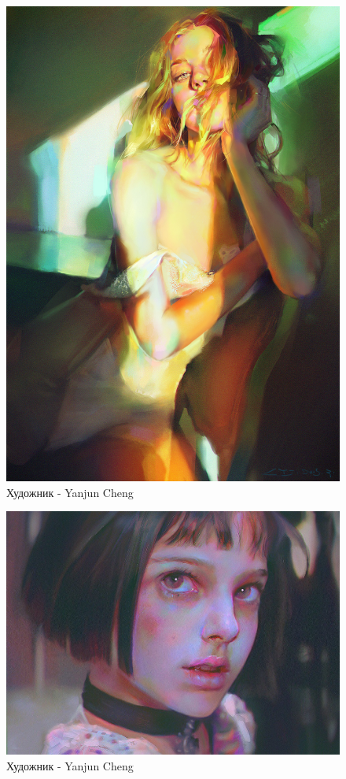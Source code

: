 \documentclass[12pt, a4paper]{article}
\theoremstyle{plain}              %
\begin{document}
\begin{figure}[H]
\begin{center}
\includegraphics[scale=0.2]{y1.jpg}
\end{center}
\caption{Художник - Yanjun Cheng}
\end{figure}

\begin{figure}[H]
\begin{center}
\includegraphics{y2.jpg}
\end{center}
\caption{Художник - Yanjun Cheng}
\end{figure}
\end{document}
